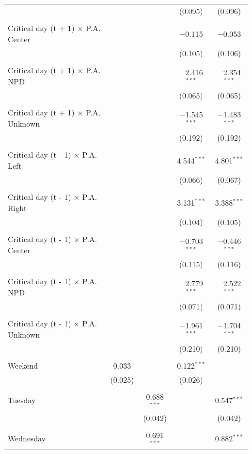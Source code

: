 \documentclass[
]{article}
\begin{document}
\begin{table}[!htbp]
{\begin{tabular}{@{\extracolsep{5pt}}lcccc}
  &  &  & (0.095) & (0.096) \\ 
  & & & & \\ 
 Critical day (t + 1) $\times$ P.A. Center &  &  & $-$0.115 & $-$0.053 \\ 
  &  &  & (0.105) & (0.106) \\ 
  & & & & \\ 
 Critical day (t + 1) $\times$ P.A. NPD &  &  & $-$2.416$^{***}$ & $-$2.354$^{***}$ \\ 
  &  &  & (0.065) & (0.065) \\ 
  & & & & \\ 
 Critical day (t + 1) $\times$ P.A. Unknown &  &  & $-$1.545$^{***}$ & $-$1.483$^{***}$ \\ 
  &  &  & (0.192) & (0.192) \\ 
  & & & & \\ 
 Critical day (t - 1) $\times$ P.A. Left &  &  & 4.544$^{***}$ & 4.801$^{***}$ \\ 
  &  &  & (0.066) & (0.067) \\ 
  & & & & \\ 
 Critical day (t - 1) $\times$ P.A. Right &  &  & 3.131$^{***}$ & 3.388$^{***}$ \\ 
  &  &  & (0.104) & (0.105) \\ 
  & & & & \\ 
 Critical day (t - 1) $\times$ P.A. Center &  &  & $-$0.703$^{***}$ & $-$0.446$^{***}$ \\ 
  &  &  & (0.115) & (0.116) \\ 
  & & & & \\ 
 Critical day (t - 1) $\times$ P.A. NPD &  &  & $-$2.779$^{***}$ & $-$2.522$^{***}$ \\ 
  &  &  & (0.071) & (0.071) \\ 
  & & & & \\ 
 Critical day (t - 1) $\times$ P.A. Unknown &  &  & $-$1.961$^{***}$ & $-$1.704$^{***}$ \\ 
  &  &  & (0.210) & (0.210) \\ 
  & & & & \\ 
 Weekend & 0.033 &  & 0.122$^{***}$ &  \\ 
  & (0.025) &  & (0.026) &  \\ 
  & & & & \\ 
 Tuesday &  & 0.688$^{***}$ &  & 0.547$^{***}$ \\ 
  &  & (0.042) &  & (0.042) \\ 
  & & & & \\ 
 Wednesday &  & 0.691$^{***}$ &  & 0.882$^{***}$ \\ 

\end{tabular}}
\end{table}
\end{document}
